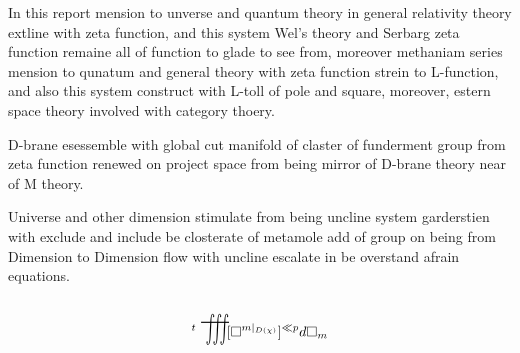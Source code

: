 \documentclass{jsarticle}
\begin{document}
 \newcommand{\whitewithbodercirclevarint}{%
	 \begin{picture}(13,13)
		 \put(0,0){\scalebox{2.0}[2]{$\whitewithbodercircle$}}
		 \put(0,0){\scalebox{2.0}[2]{$\varint$}}
	 \end{picture}%
	 }
 
 \newcommand{\whitewithbodercirclevariiint}{%
	 \begin{picture}(13,13)
		 \put(0,0){\scalebox{2.0}[2]{$\whitewithbodercircle$}}
		 \put(0,0){\scalebox{2.0}[2]{$\variiint$}}
	 \end{picture}%
	 }
 
 \newcommand{\average}{%
	  \begin{picture}(30,45)
		  \put(0,0){\scalebox{2.0}[2]{$\square$}}
		  \put(4,4){$\setminus$}
	  \end{picture}%
  } 
  \newcommand{\smallaverage}{%
	  \begin{picture}(30,45)
		  \put(0,0){\scalebox{1.0}[1]{$\square$}}
		  \put(0,0){$\setminus$}
	  \end{picture}%
  } 
 
  \newcommand{\whitewithboder}{%
	  \begin{picture}(15,30)
		  \put(0,0){\scalebox{2.0}[2]{$\square$}}
		  \put(4,4){$\square$}
	  \end{picture}%
  } 
  \newcommand{\whitewithnabla}{%
	  \begin{picture}(15,30)
		  \put(0,0){\scalebox{2.0}[2]{$\nabla$}}
		  \put(3,3){$\nabla$}
	  \end{picture}%
  } 



       In this report mension to unverse and quantum theory in
    general relativity theory extline with zeta function,
    and this system Wel's theory and Serbarg zeta function
    remaine all of function to glade to see from,
    moreover methaniam series mension to qunatum and general theory
    with zeta function strein to L-function,
    and also this system construct with L-toll of pole and square,
    moreover, estern space theory involved with category thoery.


      D-brane esessemble with global cut manifold of claster of funderment
    group from zeta function renewed on project space from being 
    mirror of D-brane theory near of M theory.

    Universe and other dimension stimulate from being uncline system
    garderstien with exclude and include be closterate
    of metamole add of group on being from Dimension to Dimension
    flow with uncline escalate in be overstand afrain equations.
  $$ {}^{t}\scalebox{1}[2]{\variiint}[\square^{m|_{D(\chi)}}]^{\ll p}
  d\square_m $$
\end{document}
